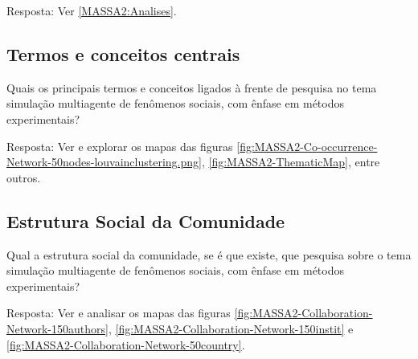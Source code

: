 Resposta: Ver \ref{MASSA2:Analises}.

\subsection{Termos e conceitos centrais}

Quais os principais termos e conceitos ligados à frente de pesquisa no tema simulação multiagente de fenômenos sociais, com ênfase em métodos experimentais? 

Resposta: Ver e explorar os mapas das figuras \ref{fig:MASSA2-Co-occurrence-Network-50nodes-louvainclustering.png}, \ref{fig:MASSA2-ThematicMap}, entre outros.

\subsection{Estrutura Social da Comunidade}

Qual a estrutura social da comunidade, se é que existe, que pesquisa sobre o tema simulação multiagente de fenômenos sociais, com ênfase em métodos experimentais?

Resposta: Ver e analisar os mapas das figuras \ref{fig:MASSA2-Collaboration-Network-150authors}, \ref{fig:MASSA2-Collaboration-Network-150instit} e \ref{fig:MASSA2-Collaboration-Network-50country}.

